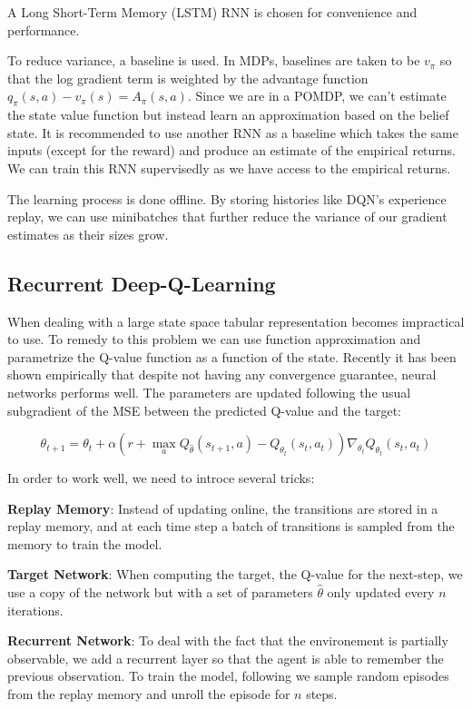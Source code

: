 \documentclass{article} %
\begin{document}
A Long Short-Term Memory\cite{hochreiter1997long} (LSTM) RNN is chosen for convenience and performance.

To reduce variance, a baseline is used. In MDPs, baselines are taken to be $v_{\pi}$ so that the log gradient term is weighted by the advantage function $q_{\pi}(s,a) - v_{\pi}(s) = A_{\pi}(s,a)$. Since we are in a POMDP, we can't estimate the state value function but instead learn an approximation based on the belief state. It is recommended to use another RNN as a baseline which takes the same inputs (except for the reward) and produce an estimate of the empirical returns. We can train this RNN supervisedly as we have access to the empirical returns.

The learning process is done offline. By storing histories like DQN's experience replay, we can use minibatches that further reduce the variance of our gradient estimates as their sizes grow.

\subsection{Recurrent Deep-Q-Learning}
When dealing with a large state space tabular representation becomes impractical to use. To remedy to this problem we can use function approximation and parametrize the Q-value function as a function of the state. Recently it has been shown \cite{mnih2015human} empirically that despite not having any convergence guarantee, neural networks performs well.
The parameters are updated following the usual subgradient of the MSE between the predicted Q-value and the target:

$$\theta_{t+1} = \theta_t + \alpha(r+\max_a Q_{\hat{\theta}}(s_{t+1}, a) - Q_{\theta_t}(s_t, a_t))\nabla_{\theta_t}Q_{\theta_t}(s_t, a_t)$$

In order to work well, we need to introce several tricks:

\textbf{Replay Memory}: Instead of updating online, the transitions are stored in a replay memory, and at each time step a batch of transitions is sampled from the memory to train the model.

\textbf{Target Network}: When computing the target, the Q-value for the next-step, we use a copy of the network but with a set of parameters $\hat{\theta}$ only updated every $n$ iterations.


\textbf{Recurrent Network}: To deal with the fact that the environement is partially observable, we add a recurrent layer so that the agent is able to remember the previous observation. To train the model, following \cite{hausknecht2015deep} we sample random episodes from the replay memory and unroll the episode for $n$ steps.
\end{document}
